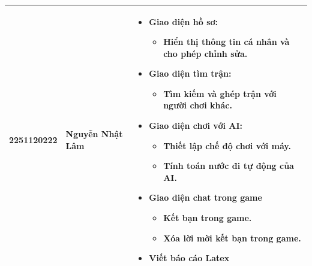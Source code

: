 \documentclass[a4paper,12pt]{article}
\begin{document}
\begin{center}
\begin{tabular}{| C{2cm} | C{3cm} | m{8cm} |}
  2251120222
  & Nguyễn Nhật Lâm
  &
  \begin{itemize}[leftmargin=*,itemsep=0pt,parsep=0pt]
    \item \textbf{Giao diện hồ sơ:}
      \begin{itemize}[leftmargin=1em,itemsep=0pt]
        \item Hiển thị thông tin cá nhân và cho phép chỉnh sửa.
      \end{itemize}
    \item \textbf{Giao diện tìm trận:}
      \begin{itemize}[leftmargin=1em,itemsep=0pt]
        \item Tìm kiếm và ghép trận với người chơi khác.
      \end{itemize}
    \item \textbf{Giao diện chơi với AI:}
      \begin{itemize}[leftmargin=1em,itemsep=0pt]
        \item Thiết lập chế độ chơi với máy.
        \item Tính toán nước đi tự động của AI.
      \end{itemize}
    \item \textbf{Giao diện chat trong game}
      \begin{itemize}[leftmargin=1em,itemsep=0pt]
        \item Kết bạn trong game.
        \item Xóa lời mời kết bạn trong game.
      \end{itemize}
    \item \textbf{Viết báo cáo Latex}
  \end{itemize}
  \\
  \hline


\end{tabular}
\end{center}
\end{document}
